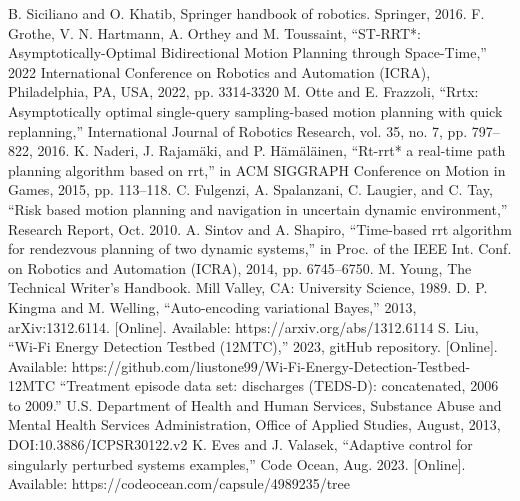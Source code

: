 \documentclass[conference]{IEEEtran}
\begin{document}
    \begin{thebibliography}{00}
         B. Siciliano and O. Khatib, Springer handbook of robotics. Springer, 2016.
         F. Grothe, V. N. Hartmann, A. Orthey and M. Toussaint, ``ST-RRT*: Asymptotically-Optimal Bidirectional Motion Planning through Space-Time,'' 2022 International Conference on Robotics and Automation (ICRA), Philadelphia, PA, USA, 2022, pp. 3314-3320
         M. Otte and E. Frazzoli, ``Rrtx: Asymptotically optimal single-query sampling-based motion planning with quick replanning,'' International Journal of Robotics Research, vol. 35, no. 7, pp. 797–822, 2016.
         K. Naderi, J. Rajamäki, and P. Hämäläinen, ``Rt-rrt* a real-time path planning algorithm based on rrt,'' in ACM SIGGRAPH Conference on Motion in Games, 2015, pp. 113–118.
         C. Fulgenzi, A. Spalanzani, C. Laugier, and C. Tay, ``Risk based motion planning and navigation in uncertain dynamic environment,'' Research Report, Oct. 2010.
         A. Sintov and A. Shapiro, ``Time-based rrt algorithm for rendezvous planning of two dynamic systems,'' in Proc. of the IEEE Int. Conf. on Robotics and Automation (ICRA), 2014, pp. 6745–6750.
         M. Young, The Technical Writer's Handbook. Mill Valley, CA: University Science, 1989.
         D. P. Kingma and M. Welling, ``Auto-encoding variational Bayes,'' 2013, arXiv:1312.6114. [Online]. Available: https://arxiv.org/abs/1312.6114
         S. Liu, ``Wi-Fi Energy Detection Testbed (12MTC),'' 2023, gitHub repository. [Online]. Available: https://github.com/liustone99/Wi-Fi-Energy-Detection-Testbed-12MTC
         ``Treatment episode data set: discharges (TEDS-D): concatenated, 2006 to 2009.'' U.S. Department of Health and Human Services, Substance Abuse and Mental Health Services Administration, Office of Applied Studies, August, 2013, DOI:10.3886/ICPSR30122.v2
         K. Eves and J. Valasek, ``Adaptive control for singularly perturbed systems examples,'' Code Ocean, Aug. 2023. [Online]. Available: https://codeocean.com/capsule/4989235/tree
    \end{thebibliography}
\end{document}
